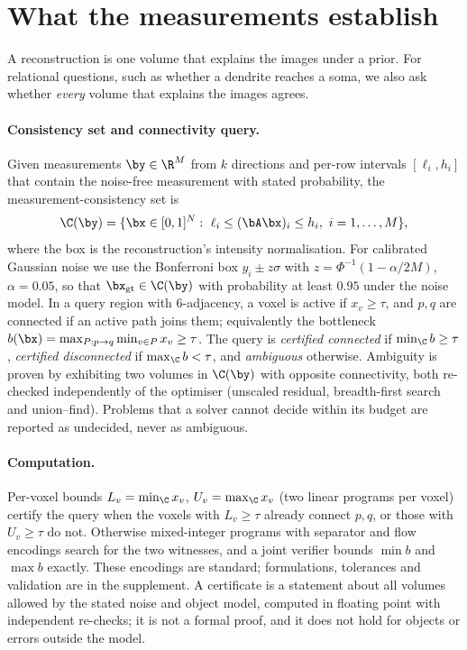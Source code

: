 \section{What the measurements establish}
\label{sec:structural}

A reconstruction is one volume that explains the images under a prior. For relational questions, such as whether a dendrite reaches a soma, we also ask whether \emph{every} volume that explains the images agrees.

\paragraph{Consistency set and connectivity query.}
Given measurements $\by\in\R^M$ from $k$ directions and per-row intervals $[\ell_i,h_i]$ that contain the noise-free measurement with stated probability, the measurement-consistency set is
\begin{equation}
\C(\by)=\{\bx\in[0,1]^N:\ \ell_i\le(\bA\bx)_i\le h_i,\ i=1,\dots,M\},
\label{eq:cset}
\end{equation}
where the box is the reconstruction's intensity normalisation. For calibrated Gaussian noise we use the Bonferroni box $y_i\pm z\sigma$ with $z=\Phi^{-1}(1-\alpha/2M)$, $\alpha=0.05$, so that $\bx_{\mathrm{gt}}\in\C(\by)$ with probability at least $0.95$ under the noise model. In a query region with 6-adjacency, a voxel is active if $x_v\ge\tau$, and $p,q$ are connected if an active path joins them; equivalently the bottleneck $b(\bx)=\max_{P:p\to q}\min_{v\in P}x_v\ge\tau$. The query is \emph{certified connected} if $\min_{\C}b\ge\tau$, \emph{certified disconnected} if $\max_{\C}b<\tau$, and \emph{ambiguous} otherwise. Ambiguity is proven by exhibiting two volumes in $\C(\by)$ with opposite connectivity, both re-checked independently of the optimiser (unscaled residual, breadth-first search and union--find). Problems that a solver cannot decide within its budget are reported as undecided, never as ambiguous.

\paragraph{Computation.}
Per-voxel bounds $L_v=\min_{\C}x_v$, $U_v=\max_{\C}x_v$ (two linear programs per voxel) certify the query when the voxels with $L_v\ge\tau$ already connect $p,q$, or those with $U_v\ge\tau$ do not. Otherwise mixed-integer programs with separator and flow encodings search for the two witnesses, and a joint verifier bounds $\min b$ and $\max b$ exactly. These encodings are standard; formulations, tolerances and validation are in the supplement. A certificate is a statement about all volumes allowed by the stated noise and object model, computed in floating point with independent re-checks; it is not a formal proof, and it does not hold for objects or errors outside the model.
